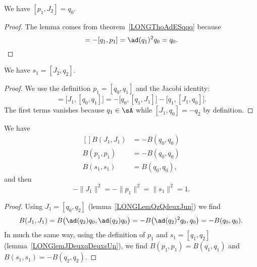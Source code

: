 \begin{lemma}		\label{LONGLempunjdeuxqzero}
	We have $[p_1,J_2]=q_0$.
\end{lemma}

\begin{proof}
	The lemma comes from theorem~\ref{LONGThoAdESqqq} because
	\begin{equation}
		[p_1,J_2]=-[q_1,p_1]=\ad(q_1)^2q_0=q_0.
	\end{equation}
\end{proof}

\begin{lemma}				 \label{LONGlemJDeuxqDeuxsUn}
	We have $s_1=[J_2,q_2]$.
\end{lemma}

\begin{proof}
	We use the definition $p_1=[q_0,q_1]$ and the Jacobi identity:
	\begin{equation}
		[J_1,p_1]=\big[ J_1,[q_0,q_1] \big]=-\big[ q_0,[q_1,J_1] \big]-\big[ q_1,[J_1,q_0] \big].
	\end{equation}
	The first terms vanishes because $q_1\in\sA$ while $[J_1,q_0]=-q_2$ by definition.
\end{proof}

\begin{proposition}		\label{LONGPropBJpsun}
	We have
	\begin{equation}
		\begin{aligned}[]
			B(J_1,J_1) & =-B(q_0,q_0) \\
			B(p_1,p_1) & =-B(q_0,q_0) \\
			B(s_1,s_1) & =B(q_0,q_0),
		\end{aligned}
	\end{equation}
	and then
	\begin{equation}
		-\| J_1 \|^2=-\| p_1 \|^2=\| s_1 \|^2=1.
	\end{equation}
\end{proposition}

\begin{proof}
	Using $J_1=[q_0,q_2]$ (lemma~\ref{LONGLemQzQdeuxJun}) we find
	\begin{equation}
		B(J_1,J_1)=B\big( \ad(q_2)q_0,\ad(q_2)q_0 \big)=-B\big( \ad(q_2)^2q_0,q_0 \big)=-B(q_0,q_0).
	\end{equation}
	In much the same way, using the definition of $p_1$ and $s_1=[q_1,q_2]$ (lemma~\ref{LONGlemJDeuxqDeuxsUn}), we find $B(p_1,p_1)=B(q_1,q_1)$ and $B(s_1,s_1)=-B(q_2,q_2)$.

\end{proof}

